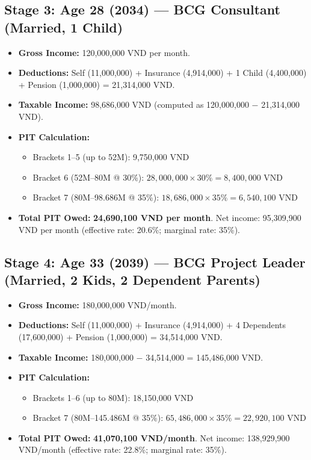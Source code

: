 \subsection{Stage 3: Age 28 (2034) --- BCG Consultant (Married, 1 Child)}
\begin{itemize}
  \item \textbf{Gross Income:} 120,000,000 VND per month.
  \item \textbf{Deductions:} Self (11,000,000) + Insurance (4,914,000) + 1 Child (4,400,000) + Pension (1,000,000) = 21,314,000 VND.
  \item \textbf{Taxable Income:} 98,686,000 VND (computed as 120,000,000 $-$ 21,314,000 VND).
  \item \textbf{PIT Calculation:}
    \begin{itemize}
      \item Brackets 1--5 (up to 52M): 9,750,000 VND
      \item Bracket 6 (52M--80M @ 30\%): $28{,}000{,}000 \times 30\% = 8{,}400{,}000$ VND
      \item Bracket 7 (80M--98.686M @ 35\%): $18{,}686{,}000 \times 35\% = 6{,}540{,}100$ VND
    \end{itemize}
  \item \textbf{Total PIT Owed:} \textbf{24,690,100 VND per month}. Net income: 95,309,900 VND per month (effective rate: 20.6\%; marginal rate: 35\%).
\end{itemize}

\subsection{Stage 4: Age 33 (2039) --- BCG Project Leader (Married, 2 Kids, 2 Dependent Parents)}
\begin{itemize}
  \item \textbf{Gross Income:} 180,000,000 VND/month.
  \item \textbf{Deductions:} Self (11,000,000) + Insurance (4,914,000) + 4 Dependents (17,600,000) + Pension (1,000,000) = 34,514,000 VND.
  \item \textbf{Taxable Income:} 180,000,000 $-$ 34,514,000 = 145,486,000 VND.
  \item \textbf{PIT Calculation:}
    \begin{itemize}
      \item Brackets 1--6 (up to 80M): 18,150,000 VND
      \item Bracket 7 (80M--145.486M @ 35\%): $65{,}486{,}000 \times 35\% = 22{,}920{,}100$ VND
    \end{itemize}
  \item \textbf{Total PIT Owed:} \textbf{41,070,100 VND/month}. Net income: 138,929,900 VND/month (effective rate: 22.8\%; marginal rate: 35\%).
\end{itemize}

